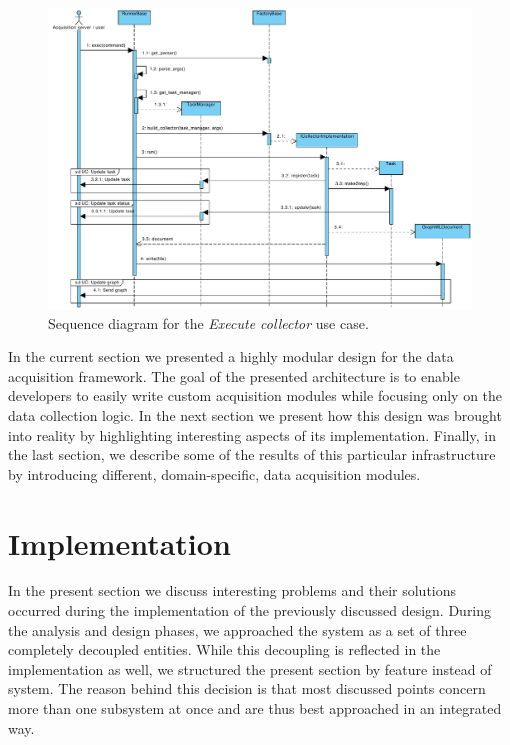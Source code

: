 \begin{figure}
  \begin{adjustwidth}{-11.6mm}{-2cm}
    \includegraphics[width=\linewidth]{images/seq-execute-collector}
  \end{adjustwidth}
  \caption{Sequence diagram for the \emph{Execute collector} use case.}
  \label{fig:seq-execute-collector}
\end{figure}

In the current section we presented a highly modular design for the data acquisition framework. The goal of the presented architecture is to enable developers to easily write custom acquisition modules while focusing only on the data collection logic. In the next section we present how this design was brought into reality by highlighting interesting aspects of its implementation. Finally, in the last section, we describe some of the results of this particular infrastructure by introducing different, domain-specific, data acquisition modules.

\section{Implementation}

In the present section we discuss interesting problems and their solutions occurred during the implementation of the previously discussed design. During the analysis and design phases, we approached the system as a set of three completely decoupled entities. While this decoupling is reflected in the implementation as well, we structured the present section by feature instead of system. The reason behind this decision is that most discussed points concern more than one subsystem at once and are thus best approached in an integrated way.

